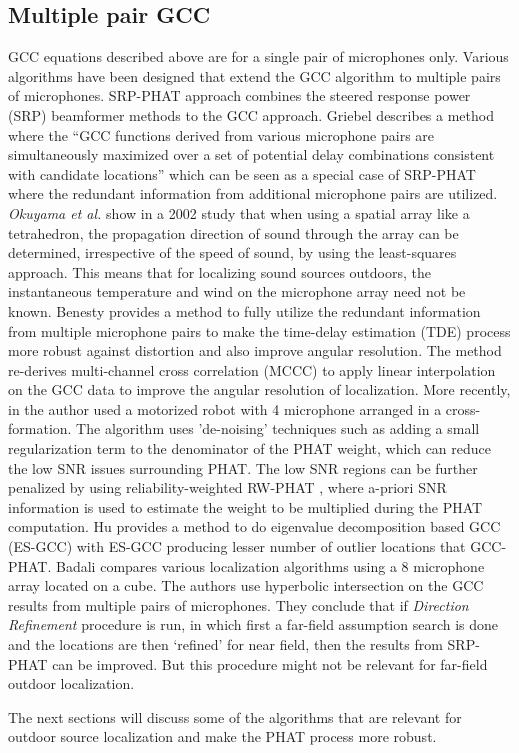 \subsection{Multiple pair GCC}

GCC equations described above are for a single pair of microphones only. Various algorithms have been designed that extend the GCC algorithm to multiple pairs of microphones. SRP-PHAT approach \cite{dibiase2000high} combines the steered response power (SRP) beamformer methods \cite{krim1996two} to the GCC approach. Griebel \cite{griebel2001microphone} describes a method where the \enquote{GCC functions derived from various microphone pairs are simultaneously maximized over a set of potential delay combinations consistent with candidate locations} which can be seen as a special case of SRP-PHAT where the redundant information from additional microphone pairs are utilized. \textit{Okuyama et al.} show in a 2002 study\cite{okuyama2002study} that when using a spatial array like a tetrahedron, the propagation direction of sound through the array can be determined, irrespective of the speed of sound, by using the least-squares approach. This means that for localizing sound sources outdoors, the instantaneous temperature and wind on the microphone array need not be known. Benesty \cite{benesty2004time} provides a method to fully utilize the redundant information from multiple microphone pairs to make the time-delay estimation (TDE) process more robust against distortion and also improve angular resolution. The method re-derives multi-channel cross correlation (MCCC) to apply linear interpolation on the GCC data to improve the angular resolution of localization. More recently, in \cite{liu2010continuous} the author used a motorized robot with 4 microphone arranged in a cross-formation. The algorithm uses 'de-noising' techniques such as adding a small regularization term to the denominator of the PHAT weight, which can reduce the low SNR issues surrounding PHAT. The low SNR regions can be further penalized by using reliability-weighted RW-PHAT \cite{valin2006robust}, where a-priori SNR information is used to estimate the weight to be multiplied during the PHAT computation. Hu\cite{hu2009estimation} provides a method to do eigenvalue decomposition based GCC (ES-GCC) with ES-GCC producing lesser number of outlier locations that GCC-PHAT. Badali \cite{badali2009evaluating} compares various localization algorithms using a 8 microphone array located on a cube. The authors use hyperbolic intersection on the GCC results from multiple pairs of microphones. They conclude that if \textit{Direction Refinement} procedure is run, in which first a far-field assumption search is done and the locations are then `refined' for near field, then the results from SRP-PHAT can be improved. But this procedure might not be relevant for far-field outdoor localization.  

The next sections will discuss some of the algorithms that are relevant for outdoor source localization and make the PHAT process more robust. 